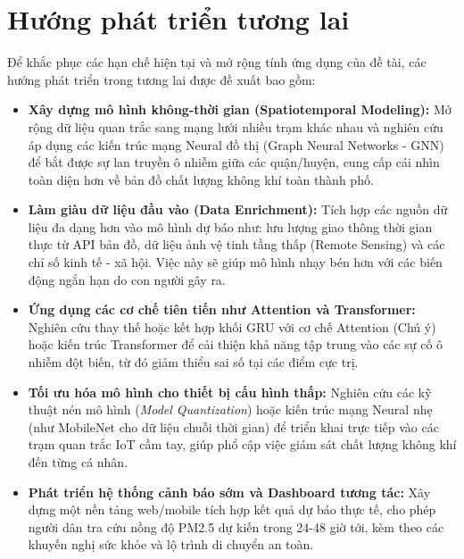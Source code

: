 \section{Hướng phát triển tương lai}

Để khắc phục các hạn chế hiện tại và mở rộng tính ứng dụng của đề tài, các hướng phát triển trong tương lai được đề xuất bao gồm:

\begin{itemize}
    \item \textbf{Xây dựng mô hình không-thời gian (Spatiotemporal Modeling):} Mở rộng dữ liệu quan trắc sang mạng lưới nhiều trạm khác nhau và nghiên cứu áp dụng các kiến trúc mạng Neural đồ thị (Graph Neural Networks - GNN) để bắt được sự lan truyền ô nhiễm giữa các quận/huyện, cung cấp cái nhìn toàn diện hơn về bản đồ chất lượng không khí toàn thành phố.
    
    \item \textbf{Làm giàu dữ liệu đầu vào (Data Enrichment):} Tích hợp các nguồn dữ liệu đa dạng hơn vào mô hình dự báo như: lưu lượng giao thông thời gian thực từ API bản đồ, dữ liệu ảnh vệ tinh tầng thấp (Remote Sensing) và các chỉ số kinh tế - xã hội. Việc này sẽ giúp mô hình nhạy bén hơn với các biến động ngắn hạn do con người gây ra.
    
    \item \textbf{Ứng dụng các cơ chế tiên tiến như Attention và Transformer:} Nghiên cứu thay thế hoặc kết hợp khối GRU với cơ chế Attention (Chú ý) hoặc kiến trúc Transformer để cải thiện khả năng tập trung vào các sự cố ô nhiễm đột biến, từ đó giảm thiểu sai số tại các điểm cực trị.
    
    \item \textbf{Tối ưu hóa mô hình cho thiết bị cấu hình thấp:} Nghiên cứu các kỹ thuật nén mô hình (\textit{Model Quantization}) hoặc kiến trúc mạng Neural nhẹ (như MobileNet cho dữ liệu chuỗi thời gian) để triển khai trực tiếp vào các trạm quan trắc IoT cầm tay, giúp phổ cập việc giám sát chất lượng không khí đến từng cá nhân.
    
    \item \textbf{Phát triển hệ thống cảnh báo sớm và Dashboard tương tác:} Xây dựng một nền tảng web/mobile tích hợp kết quả dự báo thực tế, cho phép người dân tra cứu nồng độ PM2.5 dự kiến trong 24-48 giờ tới, kèm theo các khuyến nghị sức khỏe và lộ trình di chuyển an toàn.
\end{itemize}

